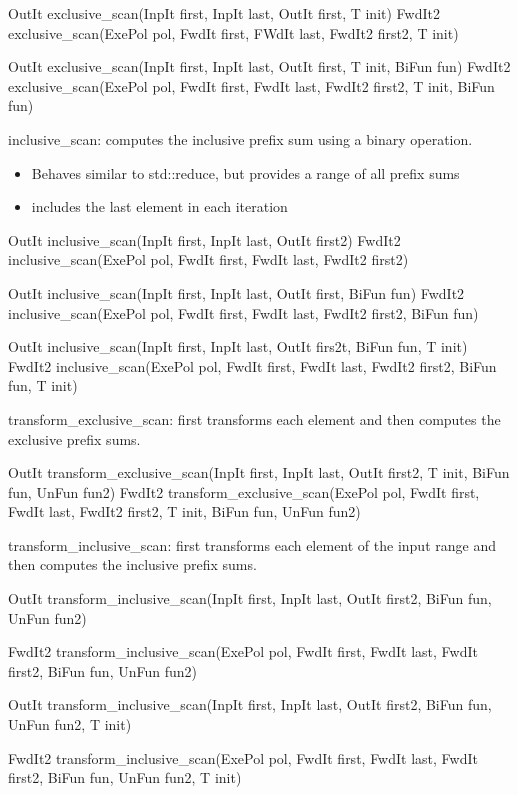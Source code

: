 \begin{cpp}
OutIt exclusive_scan(InpIt first, InpIt last, OutIt first, T init)
FwdIt2 exclusive_scan(ExePol pol, FwdIt first, FWdIt last,
					  FwdIt2 first2, T init)

OutIt exclusive_scan(InpIt first, InpIt last, OutIt first, T init, BiFun fun)
FwdIt2 exclusive_scan(ExePol pol, FwdIt first, FwdIt last,
					  FwdIt2 first2, T init, BiFun fun)
\end{cpp}

inclusive\_scan: computes the inclusive prefix sum using a binary operation.

\begin{itemize}
\item
Behaves similar to std::reduce, but provides a range of all prefix sums

\item
includes the last element in each iteration
\end{itemize}

\begin{cpp}
OutIt inclusive_scan(InpIt first, InpIt last, OutIt first2)
FwdIt2 inclusive_scan(ExePol pol, FwdIt first, FwdIt last, FwdIt2 first2)

OutIt inclusive_scan(InpIt first, InpIt last, OutIt first, BiFun fun)
FwdIt2 inclusive_scan(ExePol pol, FwdIt first, FwdIt last,
					  FwdIt2 first2, BiFun fun)

OutIt inclusive_scan(InpIt first, InpIt last, OutIt firs2t, BiFun fun, T init)
FwdIt2 inclusive_scan(ExePol pol, FwdIt first, FwdIt last,
					  FwdIt2 first2, BiFun fun, T init)
\end{cpp}

transform\_exclusive\_scan: first transforms each element and then computes the exclusive prefix sums.

\begin{cpp}
OutIt transform_exclusive_scan(InpIt first, InpIt last, OutIt first2, T init, BiFun fun, UnFun fun2)
FwdIt2 transform_exclusive_scan(ExePol pol, FwdIt first, FwdIt last, FwdIt2 first2, T init, BiFun fun, UnFun fun2)
\end{cpp}

transform\_inclusive\_scan: first transforms each element of the input range and then computes the inclusive prefix sums.

\begin{cpp}
OutIt transform_inclusive_scan(InpIt first, InpIt last, OutIt first2,
							   BiFun fun, UnFun fun2)

FwdIt2 transform_inclusive_scan(ExePol pol, FwdIt first, FwdIt last,
								FwdIt first2,
								BiFun fun, UnFun fun2)

OutIt transform_inclusive_scan(InpIt first, InpIt last, OutIt first2,
							   BiFun fun, UnFun fun2,
							   T init)

FwdIt2 transform_inclusive_scan(ExePol pol, FwdIt first, FwdIt last,
								FwdIt first2,
								BiFun fun, UnFun fun2,
								T init)
\end{cpp}

